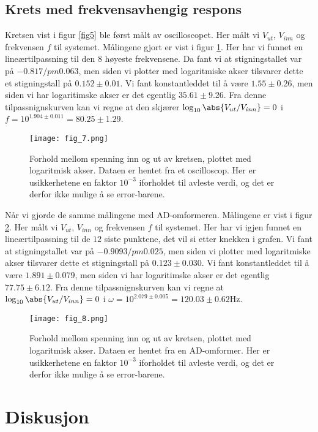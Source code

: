 \documentclass[%
 reprint,
 amsmath,amssymb,
 aps,
]{revtex4-1}
\begin{document}
\subsection{Krets med frekvensavhengig respons}
Kretsen vist i figur \ref{fig5} ble først målt av oscilloscopet. Her målt vi $V_{ut}$, $V_{inn}$ og frekvensen $f$ til systemet. Målingene gjort er vist i figur \ref{fig7}. Her har vi funnet en lineærtilpassning til den $8$ høyeste frekvensene. Da fant vi at stigningstallet var på $ -0.817 /pm 0.063$, men siden vi plotter med logaritmiske akser tilsvarer dette et stigningstall på $0.152 \pm0.01$. Vi fant konstantleddet til å være $1.55 \pm  0.26$, men siden vi har logaritimske akser er det egentlig $35.61 \pm 9.26$. Fra denne tilpassnignskurven kan vi regne at den skjærer $\log_{10} \abs{{V_{ut}/V_{inn}}} = 0$ i
$f = 10^{1.904 \pm 0.011} = 80.25 \pm 1.29$.
\begin{figure}[h!]
  \centering
  \texttt{[image: fig\_7.png]}
  \caption{Forhold mellom spenning inn og ut av kretsen, plottet med logaritmisk akser. Dataen er hentet fra et oscilloscop. Her er usikkerhetene en faktor $10^{-3}$ iforholdet til avleste verdi, og det er derfor ikke mulige å se error-barene.}
  \label{fig7}
\end{figure}
Når vi gjorde de samme målingene med AD-omformeren. Målingene er vist i figur \ref{fig8}. Her målt vi $V_{ut}$, $V_{inn}$ og frekvensen $f$ til systemet. Her har vi igjen funnet en lineærtilpassning til de $12$ siste punktene, det vil si etter knekken i grafen. Vi fant at stigningstallet var på $ -0.9093 /pm 0.025$, men siden vi plotter med logaritmiske akser tilsvarer dette et stigningstall på $0.123 \pm0.030$. Vi fant konstantleddet til å være $1.891 \pm  0.079$, men siden vi har logaritimske akser er det egentlig $77.75 \pm 6.12$. Fra denne tilpassnignskurven kan vi regne at $\log_{10} \abs{{V_{ut}/V_{inn}}} = 0$ i
$\omega = 10^{2.079 \pm 0.005} = 120.03 \pm 0.62$Hz.
\begin{figure}[h!]
  \centering
  \texttt{[image: fig\_8.png]}
  \caption{Forhold mellom spenning inn og ut av kretsen, plottet med logaritmisk akser. Dataen er hentet fra en AD-omformer. Her er usikkerhetene en faktor $10^{-3}$ iforholdet til avleste verdi, og det er derfor ikke mulige å se error-barene.}
  \label{fig8}
\end{figure}
\section{Diskusjon}
\end{document}
